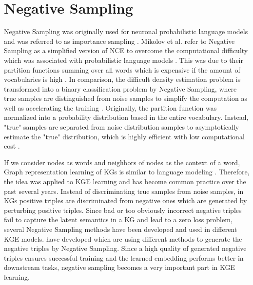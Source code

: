 \section{Negative Sampling}
\label{sec:negative_sampling}

Negative Sampling was originally used for neuronal probabilistic language models and was referred to as
importance sampling \cite{qiannegative, qianunderstanding}.
Mikolov et al. \cite{MikolovSCCD13} refer to Negative Sampling as a simplified version of \ac{NCE} to overcome the computational difficulty which was associated with probabilistic language models \cite{qianunderstanding}.
This was due to their partition functions summing over all words which is expensive if the amount of vocabularies is high \cite{qianunderstanding}.
In comparison, the difficult density estimation problem is transformed into a binary classification problem by Negative Sampling, where true samples are distinguished from noise samples to simplify the computation as well as accelerating the training \cite{qianunderstanding}.
Originally, the partition function was normalized into a probability distribution based in the entire vocabulary.
Instead, "true" samples are separated from noise distribution samples to asymptotically estimate the "true" distribution, which is highly efficient with low computational cost \cite{qianunderstanding}.

If we consider nodes as words and neighbors of nodes as the context of a word, Graph representation learning of \acp{KG} is similar to language modeling \cite{qianunderstanding}.
Therefore, the idea was applied to \ac{KGE} learning and has become common practice over the past several years.
Instead of discriminating true samples from noise samples, in \acp{KG} positive triples are discriminated from negative ones which are generated by perturbing positive triples.
Since bad or too obviously incorrect negative triples fail to capture the latent semantics in a \ac{KG} and lead to a zero loss problem, several Negative Sampling methods have been developed and used in different \ac{KGE} models.
have developed which are using different methods to generate the negative triples by Negative Sampling.
Since a high quality of generated negative triples ensures successful training and the learned embedding performs better in downstream tasks, negative sampling becomes a very important part in \ac{KGE} learning.

